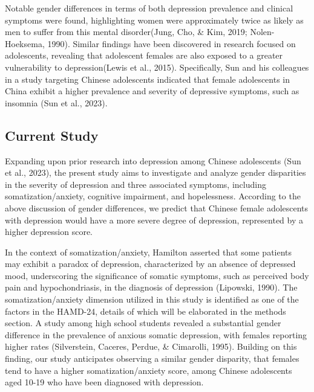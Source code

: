 \documentclass[
  man,floatsintext]{apa6}
\begin{document}
Notable gender differences in terms of both depression prevalence and clinical symptoms were found, highlighting women were approximately twice as likely as men to suffer from this mental disorder(Jung, Cho, \& Kim, 2019; Nolen-Hoeksema, 1990). Similar findings have been discovered in research focused on adolescents, revealing that adolescent females are also exposed to a greater vulnerability to depression(Lewis et al., 2015). Specifically, Sun and his colleagues in a study targeting Chinese adolescents indicated that female adolescents in China exhibit a higher prevalence and severity of depressive symptoms, such as insomnia (Sun et al., 2023).

\hypertarget{current-study}{%
\subsection{Current Study}\label{current-study}}

Expanding upon prior research into depression among Chinese adolescents (Sun et al., 2023), the present study aims to investigate and analyze gender disparities in the severity of depression and three associated symptoms, including somatization/anxiety, cognitive impairment, and hopelessness. According to the above discussion of gender differences, we predict that Chinese female adolescents with depression would have a more severe degree of depression, represented by a higher depression score.

In the context of somatization/anxiety, Hamilton asserted that some patients may exhibit a paradox of depression, characterized by an absence of depressed mood, underscoring the significance of somatic symptoms, such as perceived body pain and hypochondriasis, in the diagnosis of depression (Lipowski, 1990). The somatization/anxiety dimension utilized in this study is identified as one of the factors in the HAMD-24, details of which will be elaborated in the methods section. A study among high school students revealed a substantial gender difference in the prevalence of anxious somatic depression, with females reporting higher rates (Silverstein, Caceres, Perdue, \& Cimarolli, 1995). Building on this finding, our study anticipates observing a similar gender disparity, that females tend to have a higher somatization/anxiety score, among Chinese adolescents aged 10-19 who have been diagnosed with depression.
\end{document}
